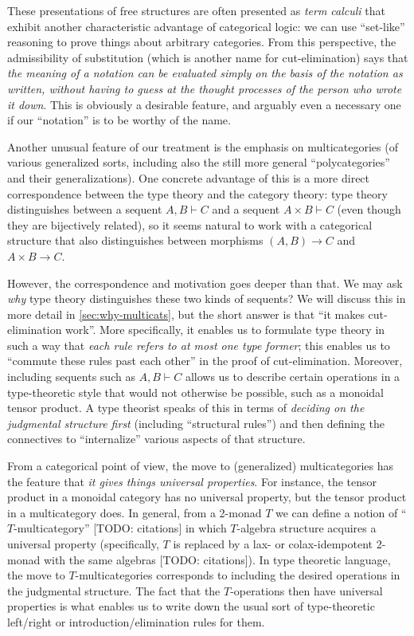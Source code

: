 \documentclass{book}
\let\types\vdash
\begin{document}
These presentations of free structures are often presented as \emph{term calculi} that exhibit another characteristic advantage of categorical logic: we can use ``set-like'' reasoning to prove things about arbitrary categories.
From this perspective, the admissibility of substitution (which is another name for cut-elimination) says that \emph{the meaning of a notation can be evaluated simply on the basis of the notation as written, without having to guess at the thought processes of the person who wrote it down}.
This is obviously a desirable feature, and arguably even a necessary one if our ``notation'' is to be worthy of the name.

Another unusual feature of our treatment is the emphasis on multicategories (of various generalized sorts, including also the still more general ``polycategories'' and their generalizations).
One concrete advantage of this is a more direct correspondence between the type theory and the category theory: type theory distinguishes between a sequent $A,B\types C$ and a sequent $A\times B\types C$ (even though they are bijectively related), so it seems natural to work with a categorical structure that also distinguishes between morphisms $(A,B)\to C$ and $A\times B\to C$.

However, the correspondence and motivation goes deeper than that.
We may ask \emph{why} type theory distinguishes these two kinds of sequents?
We will discuss this in more detail in \cref{sec:why-multicats}, but the short answer is that ``it makes cut-elimination work''.
More specifically, it enables us to formulate type theory in such a way that \emph{each rule refers to at most one type former}; this enables us to ``commute these rules past each other'' in the proof of cut-elimination.
Moreover, including sequents such as $A,B\types C$ allows us to describe certain operations in a type-theoretic style that would not otherwise be possible, such as a monoidal tensor product.
A type theorist speaks of this in terms of \emph{deciding on the judgmental structure first} (including ``structural rules'') and then defining the connectives to ``internalize'' various aspects of that structure.

From a categorical point of view, the move to (generalized) multicategories has the feature that \emph{it gives things universal properties}.
For instance, the tensor product in a monoidal category has no universal property, but the tensor product in a multicategory does.
In general, from a 2-monad $T$ we can define a notion of ``$T$-multicategory'' [TODO: citations] in which $T$-algebra structure acquires a universal property (specifically, $T$ is replaced by a lax- or colax-idempotent 2-monad with the same algebras [TODO: citations]).
In type theoretic language, the move to $T$-multicategories corresponds to including the desired operations in the judgmental structure.
The fact that the $T$-operations then have universal properties is what enables us to write down the usual sort of type-theoretic left/right or introduction/elimination rules for them.
\end{document}
